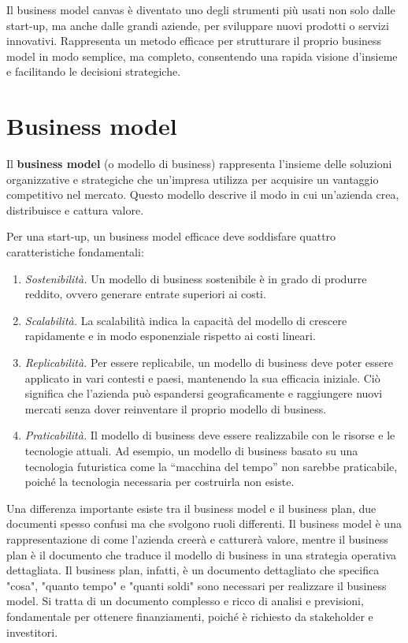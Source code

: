 Il business model canvas è diventato uno degli strumenti più usati non solo dalle start-up, ma anche dalle grandi aziende, per sviluppare nuovi prodotti o servizi innovativi. Rappresenta un metodo efficace per strutturare il proprio business model in modo semplice, ma completo, consentendo una rapida visione d’insieme e facilitando le decisioni strategiche.

\chapter{Business model}
\begin{redbar}
Il \textbf{business model} (o modello di business) rappresenta l’insieme delle soluzioni organizzative e strategiche che un’impresa utilizza per acquisire un vantaggio competitivo nel mercato. Questo modello descrive il modo in cui un’azienda crea, distribuisce e cattura valore.    
\end{redbar}
Per una start-up, un business model efficace deve soddisfare quattro caratteristiche fondamentali:
\begin{enumerate}
    \item \textit{Sostenibilità.} Un modello di business sostenibile è in grado di produrre reddito, ovvero generare entrate superiori ai costi.
    \item \textit{Scalabilità.} La scalabilità indica la capacità del modello di crescere rapidamente e in modo esponenziale rispetto ai costi lineari.
    \item \textit{Replicabilità.} Per essere replicabile, un modello di business deve poter essere applicato in vari contesti e paesi, mantenendo la sua efficacia iniziale. Ciò significa che l’azienda può espandersi geograficamente e raggiungere nuovi mercati senza dover reinventare il proprio modello di business.
    \item \textit{Praticabilità.} Il modello di business deve essere realizzabile con le risorse e le tecnologie attuali. Ad esempio, un modello di business basato su una tecnologia futuristica come la “macchina del tempo” non sarebbe praticabile, poiché la tecnologia necessaria per costruirla non esiste.
\end{enumerate}
Una differenza importante esiste tra il business model e il business plan, due documenti spesso confusi ma che svolgono ruoli differenti. Il business model è una rappresentazione di come l’azienda creerà e catturerà valore, mentre il business plan è il documento che traduce il modello di business in una strategia operativa dettagliata. Il business plan, infatti, è un documento dettagliato che specifica "cosa", "quanto tempo" e "quanti soldi" sono necessari per realizzare il business model. Si tratta di un documento complesso e ricco di analisi e previsioni, fondamentale per ottenere finanziamenti, poiché è richiesto da stakeholder e investitori.

